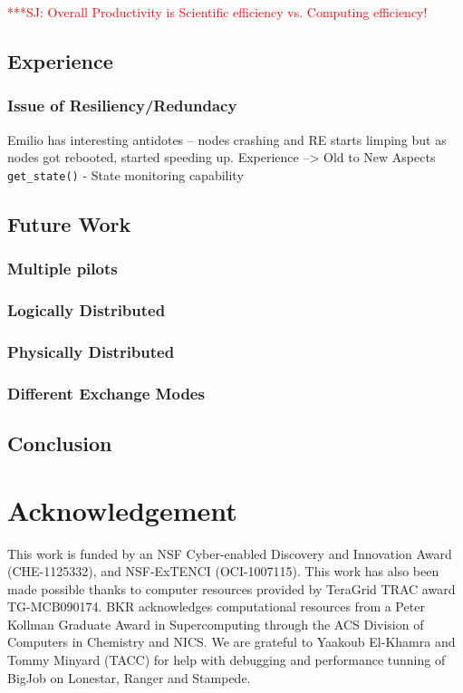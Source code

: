 \documentclass{sig-alternate}
\newcommand{\jhanote}[1]{ {\textcolor{red} { ***SJ: #1 }}}
\newcommand{\jhanote}[1]{}
\begin{document}
\jhanote{Overall Productivity is Scientific efficiency vs. Computing
  efficiency!}

\subsection{Experience}

\subsubsection{Issue of Resiliency/Redundacy} Emilio has interesting
antidotes -- nodes crashing and RE starts limping but as nodes got
rebooted, started speeding up.  Experience --> Old to New Aspects
\texttt{get\_state()} - State monitoring capability


\subsection{Future Work}

\subsubsection{Multiple pilots}

\subsubsection{Logically Distributed}
\subsubsection{Physically Distributed}

\subsubsection{Different Exchange Modes}


\subsection{Conclusion}

\section*{Acknowledgement} {\footnotesize This work is funded by an
  NSF Cyber-enabled Discovery and Innovation Award (CHE-1125332), and
  NSF-ExTENCI (OCI-1007115). This work has also been made possible
  thanks to computer resources provided by TeraGrid TRAC award
  TG-MCB090174.  BKR acknowledges computational resources from a 
  Peter Kollman Graduate Award in Supercomputing through the ACS Division of 
  Computers in Chemistry and NICS. We are grateful to Yaakoub
  El-Khamra and Tommy Minyard (TACC) for help with debugging and
  performance tunning of BigJob on Lonestar, Ranger and Stampede.}


%
%

\end{document}
